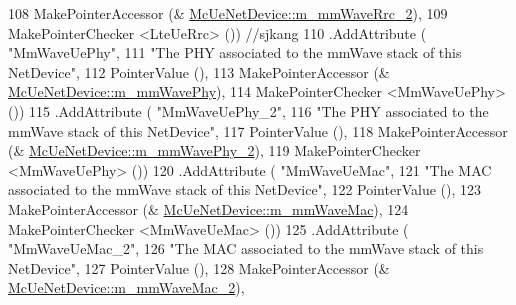 \begin{DoxyCode}
108                                                       MakePointerAccessor (&
      \hyperlink{classns3_1_1McUeNetDevice_a47adcb400e9cdf80e1618a5e693ee2ee}{McUeNetDevice::m\_mmWaveRrc\_2}),
109                                                       MakePointerChecker <LteUeRrc> ())   \textcolor{comment}{//sjkang}
110         .AddAttribute ( \textcolor{stringliteral}{"MmWaveUePhy"},
111                                         \textcolor{stringliteral}{"The PHY associated to the mmWave stack of this NetDevice"},
112                                         PointerValue (),
113                                         MakePointerAccessor (&
      \hyperlink{classns3_1_1McUeNetDevice_a9158c325114e774e31161794276b1637}{McUeNetDevice::m\_mmWavePhy}),
114                                         MakePointerChecker <MmWaveUePhy> ())
115         .AddAttribute ( \textcolor{stringliteral}{"MmWaveUePhy\_2"},
116                                                                                 \textcolor{stringliteral}{"The PHY associated to the
       mmWave stack of this NetDevice"},
117                                                                                 PointerValue (),
118                                                                                 MakePointerAccessor (&
      \hyperlink{classns3_1_1McUeNetDevice_a756cd3c4e4bc0a29b7af6e9c21e76e15}{McUeNetDevice::m\_mmWavePhy\_2}),
119                                                                                 MakePointerChecker
       <MmWaveUePhy> ())
120         .AddAttribute ( \textcolor{stringliteral}{"MmWaveUeMac"},
121                                         \textcolor{stringliteral}{"The MAC associated to the mmWave stack of this NetDevice"},
122                                         PointerValue (),
123                                         MakePointerAccessor (&
      \hyperlink{classns3_1_1McUeNetDevice_a6044ae25fdaf2ed67afa92e03f2c6449}{McUeNetDevice::m\_mmWaveMac}),
124                                         MakePointerChecker <MmWaveUeMac> ())
125         .AddAttribute ( \textcolor{stringliteral}{"MmWaveUeMac\_2"},
126                                                                                 \textcolor{stringliteral}{"The MAC associated to the
       mmWave stack of this NetDevice"},
127                                                                                 PointerValue (),
128                                                                                 MakePointerAccessor (&
      \hyperlink{classns3_1_1McUeNetDevice_a78351356a33d01051eac1fe002b8c6b3}{McUeNetDevice::m\_mmWaveMac\_2}),

\end{DoxyCode}
